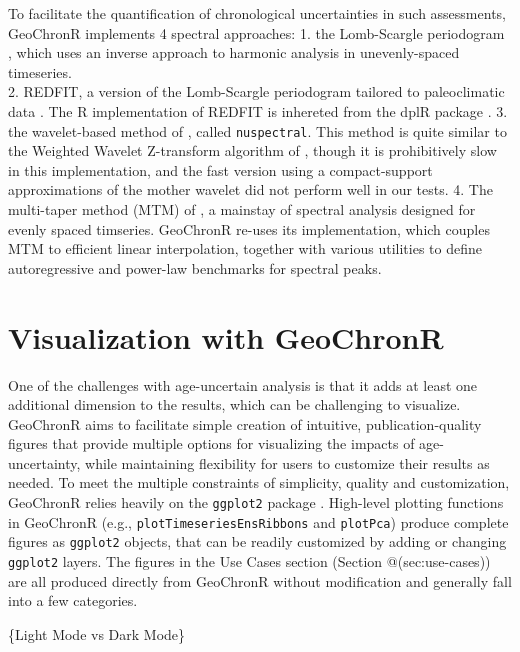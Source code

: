 \documentclass[gc, manuscript]{copernicus}
\begin{document}
To facilitate the quantification of chronological uncertainties in such
assessments, GeoChronR implements 4 spectral approaches: 1. the
Lomb-Scargle periodogram \citep{VanderPlas_2018}, which uses an inverse
approach to harmonic analysis in unevenly-spaced timeseries.\\
2. REDFIT, a version of the Lomb-Scargle periodogram tailored to
paleoclimatic data \citep[\citet{Mudelsee_02},
\citet{Mudelsee_NPG09}]{SchulzMudelsee_02}. The R implementation of
REDFIT is inhereted from the dplR package \citep{Bunn2008115}. 3. the
wavelet-based method of \citet{Mathias_JSS04}, called
\texttt{nuspectral}. This method is quite similar to the Weighted
Wavelet Z-transform algorithm of \citet{Foster_AJ96}, though it is
prohibitively slow in this implementation, and the fast version using a
compact-support approximations of the mother wavelet did not perform
well in our tests. 4. The multi-taper method (MTM) of \citet{thomson82},
a mainstay of spectral analysis \citep{Ghil02} designed for evenly
spaced timseries. GeoChronR re-uses its \citet{astrochron}
implementation, which couples MTM to efficient linear interpolation,
together with various utilities to define autoregressive and power-law
benchmarks for spectral peaks.

\section{Visualization with GeoChronR}\label{sec:visualization}

One of the challenges with age-uncertain analysis is that it adds at
least one additional dimension to the results, which can be challenging
to visualize. GeoChronR aims to facilitate simple creation of intuitive,
publication-quality figures that provide multiple options for
visualizing the impacts of age-uncertainty, while maintaining
flexibility for users to customize their results as needed. To meet the
multiple constraints of simplicity, quality and customization, GeoChronR
relies heavily on the \texttt{ggplot2} package \citep{ggplot2}.
High-level plotting functions in GeoChronR (e.g.,
\texttt{plotTimeseriesEnsRibbons} and \texttt{plotPca}) produce complete
figures as \texttt{ggplot2} objects, that can be readily customized by
adding or changing \texttt{ggplot2} layers. The figures in the Use Cases
section (Section @(sec:use-cases)) are all produced directly from
GeoChronR without modification and generally fall into a few categories.

\{Light Mode vs Dark Mode\}
\end{document}
